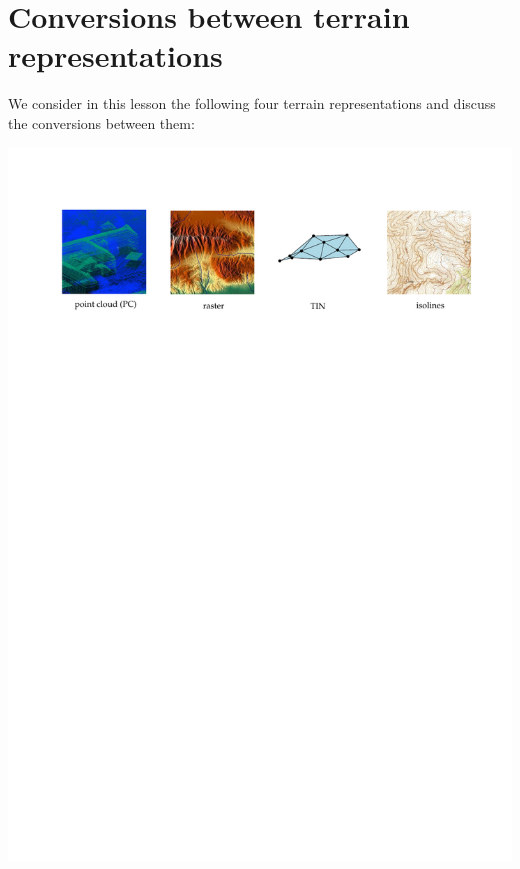 
\graphicspath{{conversion/}}

\chapter{Conversions between terrain representations}
\label{chap:conversion}

We consider in this lesson the following four terrain representations and discuss the conversions between them:
\vspace{5mm}

\includegraphics[width=\linewidth]{figs/reps}
\vspace{10mm}


